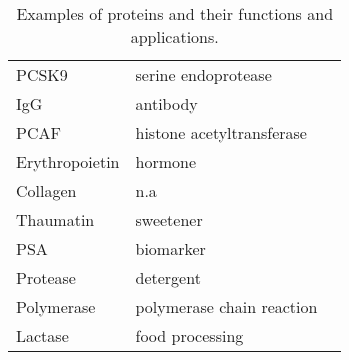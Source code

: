 \begin{refsection}
\begin{table}[htbp]
\begin{tabular}{ lll }
        PCSK9 & serine endoprotease & \cite{Lambert2012,Horton2007} \\
        IgG & antibody & \cite{Sollid2005, Meize-Grochowski} \\
        PCAF & histone acetyltransferase & \cite{Mehta2011a} \\
        Erythropoietin & hormone & \cite{Haroon2003,Siren2001} \\
        Collagen & n.a & \cite{Bella1995} \\
        Thaumatin & sweetener & \cite{Green1999} \\
        PSA & biomarker & \cite{Crawford2014} \\
        Protease & detergent & \cite{Kirk2002} \\
        Polymerase & polymerase chain reaction & \cite{Berg2002} \\
        Lactase & food processing & \cite{Wiseman1993} \\

        \hline
    \end{tabular}
    \caption[Examples of proteins and their funtions and applications.]{Examples of proteins
    and their functions and applications.} \label{tab:protein-app}
\end{table}
 

\end{refsection}
